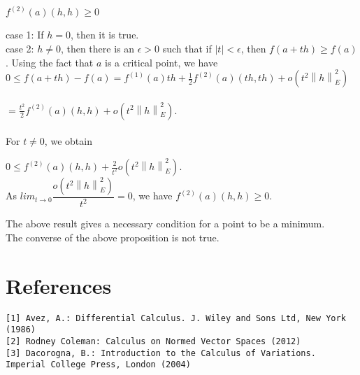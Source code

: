 \documentclass[11 pt]{article}
\theoremstyle{definition}
\theoremstyle{remark}
\newcommand\norm[1]{\left\lVert#1\right\rVert}
\begin{document}
\hspace*{4cm} $f^{(2)}(a)(h,h) \geq 0$

\proof \normalfont case 1: If $h = 0$, then it is true.\\
case 2: $h \neq 0$, then there is an $\epsilon > 0$ such that if $|t| < \epsilon$, then $f(a+th) \geq f(a)$. Using the fact that $a$ is a critical point, we have\\

$0 \leq f(a + th) - f(a) = f^{(1)}(a)th + \frac{1}{2} f^{(2)}(a)(th,th) + o(t^2\norm{h}^2_E)$\\~\\
\hspace*{2cm} $= \frac{t^2}{2} f^{(2)}(a)(h,h) + o(t^2\norm{h}^2_E)$.\\~\\
For $t \neq 0$, we obtain

\hspace*{3cm} $0 \leq f^{(2)}(a)(h,h) + \frac{2}{t^2} o(t^2\norm{h}^2_E)$.\\

As $lim_{t \to 0} \dfrac{o(t^2\norm{h}^2_E)}{t^2} = 0 $, we have $f^{(2)}(a)(h,h) \geq 0$.

The above result gives a necessary condition for a point to be a minimum.	\\

\Remark \normalfont The converse of the above proposition is not true.














\section{References}
\texttt{[1] Avez, A.: Differential Calculus. J. Wiley and Sons Ltd, New York (1986)}\\
\texttt{[2] Rodney Coleman: Calculus on Normed Vector Spaces (2012)} \\
\texttt{[3] Dacorogna, B.: Introduction to the Calculus of Variations. Imperial College Press, London
(2004)}
\end{document}
